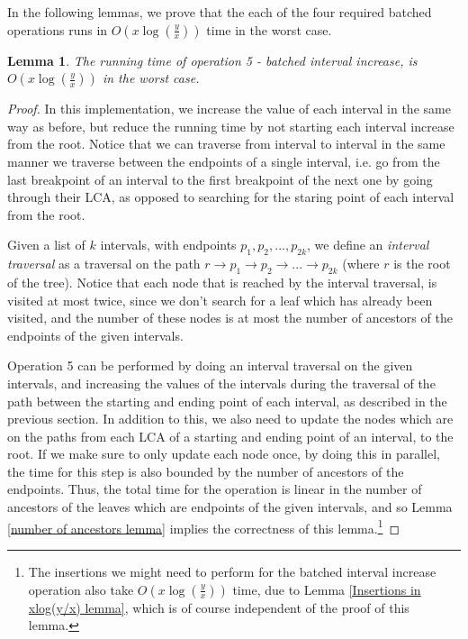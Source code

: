 \documentclass[11pt,a4paper]{article}
\newtheorem{lemma}{Lemma}
\theoremstyle{definition}
\theoremstyle{remark}
\begin{document}
In the following lemmas, we prove that the each of the four required batched operations runs in $O(x \log(\frac{y}{x}))$ time in the worst case.

\begin{lemma}
The running time of operation 5 - batched interval increase, is $O(x \log (\frac{y}{x}))$ in the worst case.
\end{lemma}
\begin{proof}
In this implementation, we increase the value of each interval in the same way as before, but reduce the running time by not starting each interval increase from the root. Notice that we can traverse from interval to interval in the same manner we traverse between the endpoints of a single interval, i.e. go from the last breakpoint of an interval to the first breakpoint of the next one by going through their LCA, as opposed to searching for the staring point of each interval from the root. 

Given a list of $k$ intervals, with endpoints $p_1,p_2,...,p_{2k}$, we define an \emph{interval traversal} as a traversal on the path $r \rightarrow p_1 \rightarrow p_2 \rightarrow ... \rightarrow p_{2k}$ (where $r$ is the root of the tree). Notice that each node that is reached by the interval traversal, is visited at most twice, since we don't search for a leaf which has already been visited, and the number of these nodes is at most the number of ancestors of the endpoints of the given intervals. 

Operation 5 can be performed by doing an interval traversal on the given intervals, and increasing the values of the intervals during the traversal of the path between the starting and ending point of each interval, as described in the previous section. In addition to this, we also need to update the nodes which are on the paths from each LCA of a starting and ending point of an interval, to the root. If we make sure to only update each node once, by doing this in parallel, the time for this step is also bounded by the number of ancestors of the endpoints. Thus, the total time for the operation is linear in the number of ancestors of the leaves which are endpoints of the given intervals, and so Lemma \ref{number of ancestors lemma} implies the correctness of this lemma.\footnote{The insertions we might need to perform for the batched interval increase operation also take $O(x \log(\frac{y}{x}))$ time, due to Lemma \ref{Insertions in xlog(y/x) lemma}, which is of course independent of the proof of this lemma.}
\end{proof}
\end{document}
